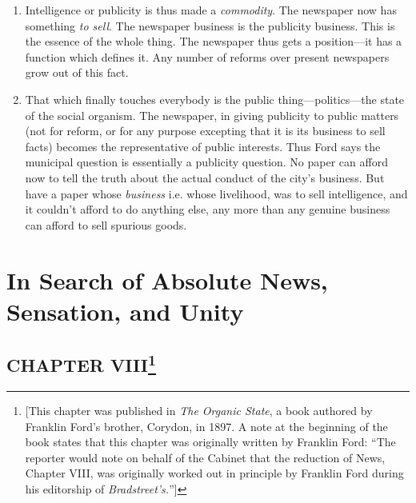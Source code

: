 \documentclass[twoside,symmetric,nobib,justified]{tufte-book}
\let\oldchapter\chapter
\def\chapter{%
  \setcounter{footnote}{0}%
  \oldchapter
}
\begin{document}
\begin{enumerate}
    \item Intelligence or publicity is thus made a \emph{commodity}. The
newspaper now has something \emph{to sell}. The newspaper business is
the publicity business. This is the essence of the whole thing. The
newspaper thus gets a position---it has a function which defines it. Any
number of reforms over present newspapers grow out of this fact.

    \item That which finally touches everybody is the public
thing---politics---the state of the social organism. The newspaper, in
giving publicity to public matters (not for reform, or for any purpose
excepting that it is its business to sell facts) becomes the
representative of public interests. Thus Ford says the municipal
question is essentially a publicity question. No paper can afford now to
tell the truth about the actual conduct of the city's business. But have
a paper whose \emph{business} i.e. whose livelihood, was to sell
intelligence, and it couldn't afford to do anything else, any more than
any genuine business can afford to sell spurious goods.

\end{enumerate}


\chapter[In Search of Absolute News, Sensation, and Unity]{In Search of Absolute News, Sensation, and Unity}
\label{ch:In Search of Absolute News, Sensation, and Unity}

\vspace{.2in}

\begin{LARGE}


\end{LARGE}

\vspace{0.5in}
\hypertarget{chapter-viii}{%
\section[CHAPTER VIII~]{\texorpdfstring{CHAPTER
VIII\footnote{{[}This chapter was published in \emph{The Organic
  State}, a book authored by Franklin Ford's brother, Corydon, in 1897.
  A note at the beginning of the book states that this chapter was
  originally written by Franklin Ford: ``The reporter would note on
  behalf of the Cabinet that the reduction of News, Chapter VIII, was
  originally worked out in principle by Franklin Ford during his
  editorship of \emph{Bradstreet's.}''{]}}}{CHAPTER VIII~}}\label{chapter-viii}}
\end{document}
